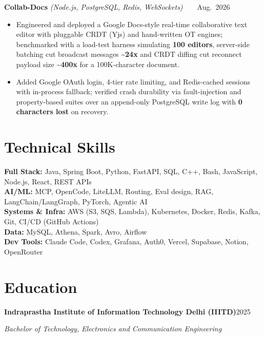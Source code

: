 \documentclass[10pt,letterpaper]{article}
\newcommand{\resumeHeading}[4]{%
  \par\noindent\textbf{#1}\hfill\mbox{#2}\par
  \noindent\textit{#3}\hfill\mbox{\textit{#4}}\par
}
\newcommand{\projectHeading}[3]{%
  \par\noindent\textbf{#1} \textit{(#2)}\hfill\mbox{#3}\par
}
\begin{document}
\projectHeading{Collab-Docs}{Node.js, PostgreSQL, Redis, WebSockets}{\scriptsize\href{https://github.com/dreddak47/collab-docs}{\faGithub}\ \textbar\ \href{https://collab-client-kvn5.onrender.com/}{\faExternalLink}\ \textbar\ \normalsize Aug. 2026}
\begin{itemize}
  \item Engineered and deployed a Google Docs-style real-time collaborative text editor with pluggable CRDT (Yjs) and hand-written OT engines; benchmarked with a load-test harness simulating \textbf{100 editors}, server-side batching cut broadcast messages \textbf{\textasciitilde 24x} and CRDT diffing cut reconnect payload size \textbf{\textasciitilde 400x} for a 100K-character document.
  \item Added Google OAuth login, 4-tier rate limiting, and Redis-cached sessions with in-process fallback; verified crash durability via fault-injection and property-based suites over an append-only PostgreSQL write log with \textbf{0 characters lost} on recovery.
\end{itemize}

\section{Technical Skills}
\textbf{Full Stack:} Java, Spring Boot, Python, FastAPI, SQL, C++, Bash, JavaScript, Node.js, React, REST APIs \\[-1pt]
\textbf{AI/ML:} MCP, OpenCode, LiteLLM, Routing, Eval design, RAG, LangChain/LangGraph, PyTorch, Agentic AI \\[-1pt]
\textbf{Systems \& Infra:} AWS (S3, SQS, Lambda), Kubernetes, Docker, Redis, Kafka, Git, CI/CD (GitHub Actions) \\[-1pt]
\textbf{Data:} MySQL, Athena, Spark, Avro, Airflow \\[-1pt]
\textbf{Dev Tools:} Claude Code, Codex, Grafana, Auth0, Vercel, Supabase, Notion, OpenRouter \\[-1pt]

\section{Education}
\resumeHeading
  {Indraprastha Institute of Information Technology Delhi (IIITD)}
  {2025}
  {Bachelor of Technology, Electronics and Communication Engineering}
  {}
\end{document}
